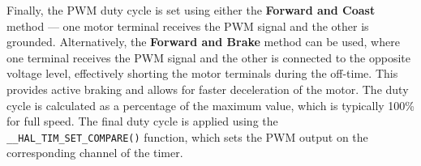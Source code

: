 Finally, the PWM duty cycle is set using either the \textbf{Forward and Coast} method --- one motor terminal receives the PWM signal and the other is grounded. 
Alternatively, the \textbf{Forward and Brake} method can be used, where one terminal receives the PWM signal and the other is connected to the opposite voltage level, effectively shorting the motor terminals during the off-time. 
This provides active braking and allows for faster deceleration of the motor.
The duty cycle is calculated as a percentage of the maximum value, which is typically 100\% for full speed.
The final duty cycle is applied using the \texttt{\_\_HAL\_TIM\_SET\_COMPARE()} function, which sets the PWM output on the corresponding channel of the timer.